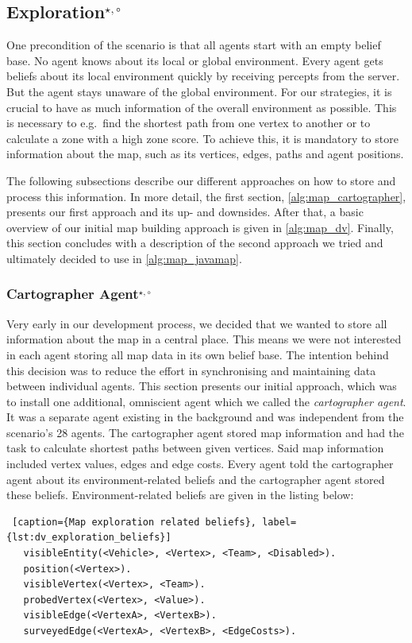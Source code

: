 \subsection[Exploration]{Exploration$^{\star,\circ}$}\label{alg:exploration} %
One precondition of the \mars scenario is that all agents start with an empty belief base.
No agent knows about its local or global environment.
Every agent gets beliefs about its local environment quickly by receiving percepts from the server.
But the agent stays unaware of the global environment.
For our strategies, it is crucial to have as much information of the overall environment as possible.
This is necessary to e.g.\ find the shortest path from one vertex to another or to calculate a zone with a high zone score.
To achieve this, it is mandatory to store information about the map, such as its vertices, edges, paths and agent positions.

The following subsections describe our different approaches on how to store and process this information.
In more detail, the first section, \autoref{alg:map_cartographer}, presents our first approach and its up- and downsides.
After that, a basic overview of our initial map building approach is given in \autoref{alg:map_dv}.
Finally, this section concludes with a description of the second approach we tried and ultimately decided to use in \autoref{alg:map_javamap}.

\subsubsection[Cartographer Agent]{Cartographer Agent$^{\star,\circ}$}\label{alg:map_cartographer}
Very early in our development process, we decided that we wanted to store all information about the map in a central place.
This means we were not interested in each agent storing all map data in its own belief base.
The intention behind this decision was to reduce the effort in synchronising and maintaining data between individual agents.
This section presents our initial approach, which was to install one additional, omniscient agent which we called the \emph{cartographer agent}.
It was a separate agent existing in the background and was independent from the scenario's 28 agents.
The cartographer agent stored map information and had the task to calculate shortest paths between given vertices.
Said map information included vertex values, edges and edge costs.
Every agent told the cartographer agent about its environment-related beliefs and the cartographer agent stored these beliefs.
Environment-related beliefs are given in the listing below:
\begin{lstlisting} [caption={Map exploration related beliefs}, label={lst:dv_exploration_beliefs}]
   visibleEntity(<Vehicle>, <Vertex>, <Team>, <Disabled>).
   position(<Vertex>).
   visibleVertex(<Vertex>, <Team>).
   probedVertex(<Vertex>, <Value>).
   visibleEdge(<VertexA>, <VertexB>).
   surveyedEdge(<VertexA>, <VertexB>, <EdgeCosts>).
\end{lstlisting}

